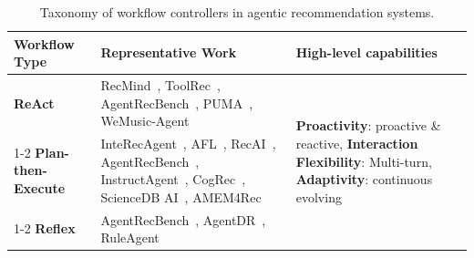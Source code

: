 


\begin{table}[!t]
\caption{Taxonomy of workflow controllers in agentic recommendation systems.}
\label{tab:workflow_controllers}
\vspace{-8pt}
\small
\setlength{\tabcolsep}{4pt}
\begin{tabularx}{\columnwidth}{p{} X p{}}
\toprule
\textbf{Workflow Type} & \textbf{Representative Work} & \textbf{High-level capabilities} \\
\midrule
\textbf{ReAct} 
& RecMind~\cite{wang2024recmind}, ToolRec~\cite{zhao2024toolrec}, AgentRecBench~\cite{shang2025agentrecbench}, PUMA~\cite{cai2025large}, WeMusic-Agent\cite{bi2025wemusic}
& \multirow{3}{=}{\newline \textbf{Proactivity}: proactive \& reactive,\newline \newline
\textbf{Interaction Flexibility}: Multi-turn,\newline \newline
\textbf{Adaptivity}: continuous evolving} \\
\cmidrule{1-2}
\textbf{Plan-then-Execute} 
& InteRecAgent~\cite{huang2024interecagent}, AFL~\cite{cai2025agentic}, RecAI~\cite{lian2024recai}, AgentRecBench~\cite{shang2025agentrecbench}, InstructAgent~\cite{xu2025iagent}, CogRec~\cite{hu2025cogrec}, ScienceDB AI~\cite{long2026sciencedb}, AMEM4Rec~\cite{nguyen2026amem4rec}
& \\
\cmidrule{1-2}
\textbf{Reflex}
& AgentRecBench~\cite{shang2025agentrecbench}, AgentDR~\cite{yang2025agentdr}, RuleAgent~\cite{wang2025ruleagent}
& \\
\bottomrule
\end{tabularx}
\end{table}